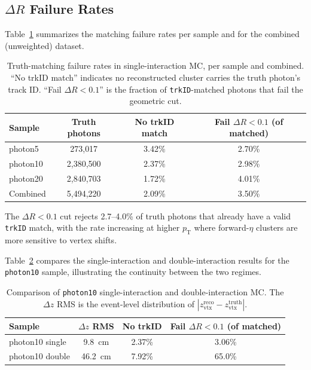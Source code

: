 \documentclass[11pt,letterpaper]{article}
\newcommand{\DR}{\ensuremath{\Delta R}}
\newcommand{\pT}{\ensuremath{p_{\text{T}}}}
\begin{document}
\subsection{\texorpdfstring{$\DR$}{Delta R} Failure Rates}
\label{sec:rates}

Table~\ref{tab:persample} summarizes the matching failure rates per sample and
for the combined (unweighted) dataset.

\begin{table}[htbp]
\centering
\caption{Truth-matching failure rates in single-interaction MC, per sample and
  combined. ``No trkID match'' indicates no reconstructed cluster carries the
  truth photon's track ID. ``Fail $\DR < 0.1$'' is the fraction of
  \texttt{trkID}-matched photons that fail the geometric cut.}
\label{tab:persample}
\begin{tabular}{lccc}
\toprule
\textbf{Sample} & \textbf{Truth photons} & \textbf{No trkID match} &
  \textbf{Fail $\DR < 0.1$ (of matched)} \\
\midrule
photon5  & 273{,}017   & 3.42\% & 2.70\% \\
photon10 & 2{,}380{,}500 & 2.37\% & 2.98\% \\
photon20 & 2{,}840{,}703 & 1.72\% & 4.01\% \\
\midrule
Combined & 5{,}494{,}220 & 2.09\% & 3.50\% \\
\bottomrule
\end{tabular}
\end{table}

The $\DR < 0.1$ cut rejects 2.7--4.0\% of truth photons that already have a
valid \texttt{trkID} match, with the rate increasing at higher $\pT$ where
forward-$\eta$ clusters are more sensitive to vertex shifts.

Table~\ref{tab:singledouble} compares the single-interaction and
double-interaction results for the \texttt{photon10} sample, illustrating the
continuity between the two regimes.

\begin{table}[htbp]
\centering
\caption{Comparison of \texttt{photon10} single-interaction and
  double-interaction MC. The $\Delta z$ RMS is the event-level distribution
  of $|z_{\text{vtx}}^{\text{reco}} - z_{\text{vtx}}^{\text{truth}}|$.}
\label{tab:singledouble}
\begin{tabular}{lccc}
\toprule
\textbf{Sample} & \textbf{$\Delta z$ RMS} & \textbf{No trkID} &
  \textbf{Fail $\DR < 0.1$ (of matched)} \\
\midrule
photon10 single & 9.8~cm & 2.37\% & 3.06\% \\
photon10 double & 46.2~cm & 7.92\% & 65.0\% \\
\bottomrule
\end{tabular}
\end{table}
\end{document}
